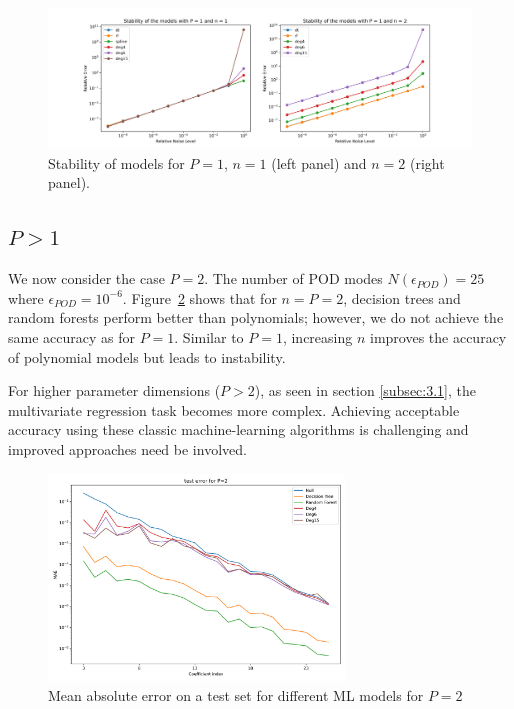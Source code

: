 \documentclass[graybox]{svmult}
\begin{document}
\begin{figure}[!hb]
    \centering
\includegraphics[width=1.0\textwidth] {stabP1.png}
    \caption{Stability of models for $P=1$, $n=1$ (left panel) and $n=2$ (right panel).}
    \label{fig:stabP1}
\end{figure}


\subsection{$P>1$}
\label{subsec:4.2}
We now consider the case $P=2$. The number of POD modes $N(\epsilon_{POD})=25$ where $\epsilon_{POD}=10^{-6}$. Figure~\ref{fig:MLP2} shows that for $n=P=2$, decision trees and random forests perform better than polynomials; however, we do not achieve the same accuracy as for $P=1$. Similar to $P=1$, increasing $n$ improves the accuracy of polynomial models but leads to instability.

For higher parameter dimensions ($P>2$), as seen in section \ref{subsec:3.1}, the multivariate regression task becomes more complex. Achieving acceptable accuracy using these classic machine-learning algorithms is challenging and improved approaches need be involved.

\begin{figure}[!hb]
    \centering
\includegraphics[width=0.7\textwidth] {MLP2.png}
   \caption{Mean absolute error on a test set for different ML models for $P=2$}
    \label{fig:MLP2}
\end{figure}
\end{document}
